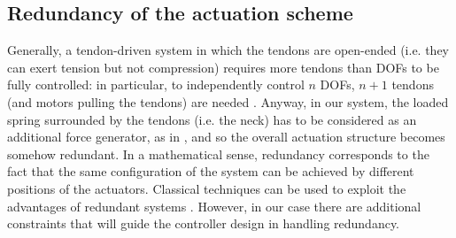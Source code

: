 \documentclass[conference]{IEEEtran}
\numberwithin{equation}{section}
\begin{document}
\subsection{Redundancy of the actuation scheme}

Generally, a tendon-driven system in which the tendons are open-ended (i.e. they can exert tension but not compression) requires more tendons than DOFs to be fully controlled: in particular, to independently control $n$ DOFs, $n+1$ tendons (and motors pulling the tendons) are needed \cite{Tsai}. Anyway, in our system, the loaded spring surrounded by the tendons (i.e. the neck) has to be considered as an additional force generator, as in \cite{Rovetta77}, and so the overall actuation structure becomes somehow redundant. In a mathematical sense, redundancy corresponds to the fact that the same configuration of the system can be achieved by different positions of the actuators. Classical techniques can be used to exploit the advantages of redundant systems \cite{SamsonEspiau}. However, in our case there are additional constraints that will guide the controller design in handling redundancy. 
\end{document}
